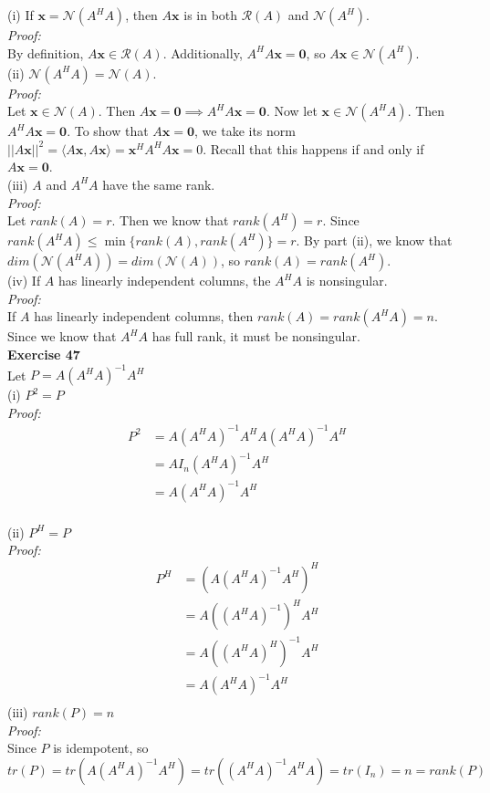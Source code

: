 \documentclass[letterpaper,12pt]{article}
\let\vec\mathbf
\theoremstyle{definition}
\begin{document}
(i) If $\vec{x} = \mathscr{N}(A^HA)$, then $A\vec{x}$ is in both $\mathscr{R}(A)$ and $\mathscr{N}(A^H)$. \\
\textit{Proof:} \\
By definition, $A\vec{x} \in \mathscr{R}(A)$. Additionally, $A^HA\vec{x} = \vec{0}$, so $A\vec{x} \in \mathscr{N}(A^H)$. \\

(ii) $\mathscr{N}(A^HA) = \mathscr{N}(A)$. \\
\textit{Proof:} \\
Let $\vec{x} \in \mathscr{N}(A)$. Then $A\vec{x} = \vec{0} \implies A^HA\vec{x} = \vec{0}$. Now let $\vec{x} \in \mathscr{N}(A^HA)$. Then $A^HA\vec{x} = \vec{0}$. To show that $A\vec{x} = \vec{0}$, we take its norm $||A\vec{x}||^2 = \langle A\vec{x}, A\vec{x} \rangle = \vec{x}^HA^HA\vec{x} = 0$. Recall that this happens if and only if $A\vec{x} = \vec{0}$. \\

(iii) $A$ and $A^HA$ have the same rank. \\
\textit{Proof:} \\
Let $rank(A)=r$. Then we know that $rank(A^H)=r$. Since $rank(A^HA) \leq \min\{rank(A), rank(A^H)\} = r$. By part (ii), we know that $dim(\mathscr{N}(A^HA)) = dim(\mathscr{N}(A))$, so $rank(A)=rank(A^H)$. \\

(iv) If $A$ has linearly independent columns, the $A^HA$ is nonsingular. \\
\textit{Proof:} \\
If $A$ has linearly independent columns, then $rank(A) = rank(A^HA) = n$. Since we know that $A^HA$ has full rank, it must be nonsingular. \\

\textbf{Exercise 47} \\
Let $P = A(A^H A)^{-1}A^H$ \\
(i) $P^2 = P$ \\
\textit{Proof:}
\begin{align*}
  P^2 &= A(A^H A)^{-1} A^H A (A^H A)^{-1} A^H \\
  &= A I_n (A^H A)^{-1} A^H \\
  &= A (A^H A)^{-1} A^H \\
\end{align*}

(ii) $P^H = P$ \\
\textit{Proof:}
\begin{align*}
  P^H &= (A(A^H A)^{-1}A^H)^H \\
  &= A ((A^H A)^{-1})^H A^H \\
  &= A ((A^H A)^H)^{-1} A^H \\
  &= A (A^H A)^{-1} A^H \\
\end{align*}
(iii) $rank(P) = n$ \\
\textit{Proof:} \\
Since $P$ is idempotent, so
$tr(P) = tr(A(A^HA)^{-1}A^H) = tr((A^HA)^{-1}A^HA) = tr(I_n) = n = rank(P)$ \\
\end{document}
